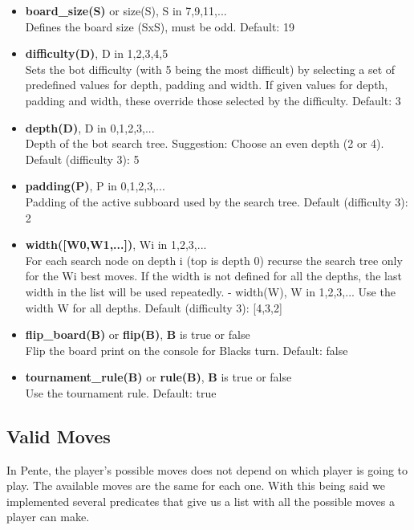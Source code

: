 \documentclass[12pt,a4paper,notitlepage]{article}
\begin{document}
\begin{itemize}
	\item \textbf{board\_size(S)} or size(S), S in {7,9,11,...}\\
	Defines the board size (SxS), must be odd.
	Default: 19
	\item \textbf{difficulty(D)}, D in {1,2,3,4,5}\\
	Sets the bot difficulty (with 5 being the most
	difficult) by selecting a set of predefined values
	for depth, padding and width. If given values for
	depth, padding and width, these override those selected
	by the difficulty.
	Default: 3
	\item \textbf{depth(D)}, D in {0,1,2,3,...}\\
	Depth of the bot search tree.
	Suggestion: Choose an even depth (2 or 4).
	Default (difficulty 3): 5
	\item \textbf{padding(P)}, P in {0,1,2,3,...}\\
	Padding of the active subboard used by the search tree.
	Default (difficulty 3): 2
	\item \textbf{width([W0,W1,...])}, Wi in {1,2,3,...}\\
	For each search node on depth i (top is depth 0)
	recurse the search tree only for the Wi best moves.
	If the width is not defined for all the depths, the
	last width in the list will be used repeatedly.
	- width(W), W in {1,2,3,...}
	Use the width W for all depths.
	Default (difficulty 3): [4,3,2]
	\item \textbf{flip\_board(B)} or \textbf{flip(B)}, \textbf{B} is true or false\\
	Flip the board print on the console for Blacks turn.
	Default: false
	\item \textbf{tournament\_rule(B)} or \textbf{rule(B)}, \textbf{B} is true or false\\
	Use the tournament rule.
	Default: true
\end{itemize}

\subsection{Valid Moves}
\label{subsec:validmoves}

In Pente, the player's possible moves does not depend on which player is going to play. The available moves are the same for each one.
With this being said we implemented several predicates that give us a list with all the possible moves a player can make.
\end{document}

